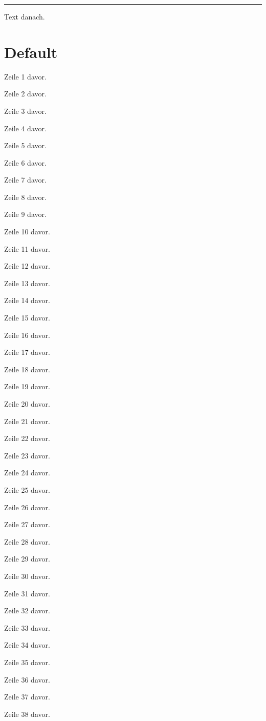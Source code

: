 \begin{Figure}[title=Opt Out Figure, break=false]
\rule{\linewidth}{90mm}
\end{Figure}

Text danach.

\clearpage
\section{Default}
Zeile 1 davor.

Zeile 2 davor.

Zeile 3 davor.

Zeile 4 davor.

Zeile 5 davor.

Zeile 6 davor.

Zeile 7 davor.

Zeile 8 davor.

Zeile 9 davor.

Zeile 10 davor.

Zeile 11 davor.

Zeile 12 davor.

Zeile 13 davor.

Zeile 14 davor.

Zeile 15 davor.

Zeile 16 davor.

Zeile 17 davor.

Zeile 18 davor.

Zeile 19 davor.

Zeile 20 davor.

Zeile 21 davor.

Zeile 22 davor.

Zeile 23 davor.

Zeile 24 davor.

Zeile 25 davor.

Zeile 26 davor.

Zeile 27 davor.

Zeile 28 davor.

Zeile 29 davor.

Zeile 30 davor.

Zeile 31 davor.

Zeile 32 davor.

Zeile 33 davor.

Zeile 34 davor.

Zeile 35 davor.

Zeile 36 davor.

Zeile 37 davor.

Zeile 38 davor.

